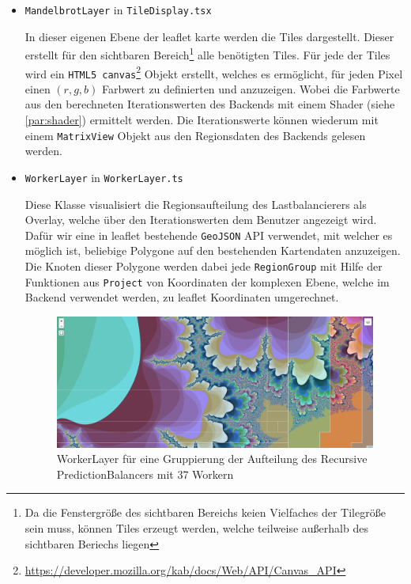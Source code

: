 \begin{itemize}
	\item \verb|MandelbrotLayer| in \verb|TileDisplay.tsx|

	      In dieser eigenen Ebene der leaflet karte werden die Tiles dargestellt.
	      Dieser erstellt für den sichtbaren Bereich\footnote{
		      Da die Fenstergröße des sichtbaren Bereichs keien Vielfaches der Tilegröße sein muss,
		      können Tiles erzeugt werden, welche teilweise außerhalb des sichtbaren Beriechs liegen}
	      alle benötigten Tiles. Für jede der Tiles wird ein \verb|HTML5 canvas|\footnote{\url{https://developer.mozilla.org/kab/docs/Web/API/Canvas_API}} Objekt erstellt, welches es
	      ermöglicht, für jeden Pixel einen \( (r,g,b) \) Farbwert zu definierten und anzuzeigen. Wobei die Farbwerte aus den berechneten
	      Iterationswerten des Backends mit einem Shader (siehe \autoref{par:shader}) ermittelt werden. Die Iterationswerte können wiederum
	      mit einem \verb|MatrixView| Objekt aus den Regionsdaten des Backends gelesen werden.

	\item \verb|WorkerLayer| in \verb|WorkerLayer.ts|\label{par:workerLayer}

	      Diese Klasse visualisiert die Regionsaufteilung des Lastbalancierers als Overlay, welche über den Iterationswerten
	      dem Benutzer angezeigt wird.
	      Dafür wir eine in leaflet bestehende \verb|GeoJSON| API verwendet, mit welcher es möglich
	      ist, beliebige Polygone auf den bestehenden Kartendaten anzuzeigen. Die Knoten dieser Polygone werden dabei jede \verb|RegionGroup|
	      mit Hilfe der Funktionen aus \verb|Project| von Koordinaten der komplexen Ebene, welche im Backend verwendet werden, zu
	      leaflet Koordinaten umgerechnet.

	      \begin{figure}
		      \centering
		      \includegraphics[width=.85\linewidth]{img/Implementierung/regionGrouping}
		      \caption{WorkerLayer für eine Gruppierung der Aufteilung des Recursive PredictionBalancers mit 37 Workern}
		      \label{fig:regionGrouping}
	      \end{figure}


\end{itemize}

